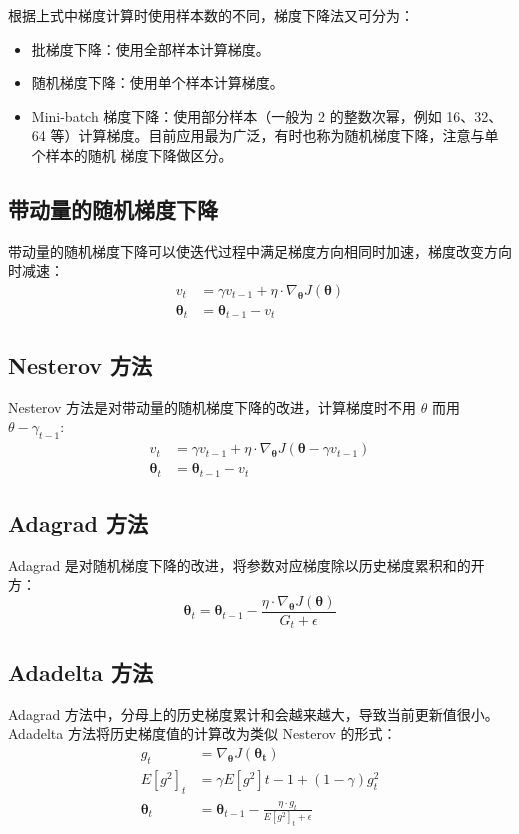 根据上式中梯度计算时使用样本数的不同，梯度下降法又可分为：
\begin{itemize}
  \item 批梯度下降：使用全部样本计算梯度。
  \item 随机梯度下降：使用单个样本计算梯度。
  \item Mini-batch 梯度下降：使用部分样本（一般为 2 的整数次幂，例如 16、32、64
    等）计算梯度。目前应用最为广泛，有时也称为随机梯度下降，注意与单个样本的随机
    梯度下降做区分。
\end{itemize}

\subsection{带动量的随机梯度下降}
带动量的随机梯度下降可以使迭代过程中满足梯度方向相同时加速，梯度改变方向时减速：
\begin{align}
  v_t & = \gamma v_{t-1} + \eta \cdot \nabla_{\boldsymbol{\theta}}J(\boldsymbol{\theta}) \\
  \boldsymbol{\theta}_{t} & = \boldsymbol{\theta}_{t-1} - v_t
\end{align}

\subsection{Nesterov 方法}
Nesterov 方法是对带动量的随机梯度下降的改进，计算梯度时不用 $\theta$ 而用
$\theta - \gamma_{t-1}$:
\begin{align}
  v_t & = \gamma v_{t-1} + \eta \cdot \nabla_{\boldsymbol{\theta}}J(\boldsymbol{\theta}-\gamma v_{t-1}) \\
  \boldsymbol{\theta}_{t} & = \boldsymbol{\theta}_{t-1} - v_t
\end{align}

\subsection{Adagrad 方法}
Adagrad 是对随机梯度下降的改进，将参数对应梯度除以历史梯度累积和的开方：
\begin{equation}
  \boldsymbol{\theta}_{t} = \boldsymbol{\theta}_{t-1} - \frac{\eta \cdot \nabla_{\boldsymbol{\theta}}J(\boldsymbol{\theta})}{G_t + \epsilon}
\end{equation}

\subsection{Adadelta 方法}
Adagrad 方法中，分母上的历史梯度累计和会越来越大，导致当前更新值很小。Adadelta
方法将历史梯度值的计算改为类似 Nesterov 的形式：
\begin{align}
  g_t & = \nabla_{\boldsymbol{\theta}}J(\boldsymbol{\theta_t}) \\
  {E[g^2]}_t & = \gamma {E[g^2]} {t-1} + (1-\gamma)g_t^2 \\
  \boldsymbol{\theta}_{t} & = \boldsymbol{\theta}_{t-1} - \frac{\eta \cdot g_t}{{E[g^2]}_t+\epsilon}
\end{align}

